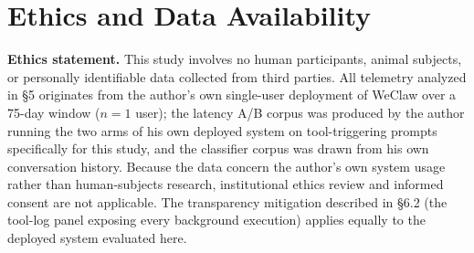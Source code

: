 \documentclass[numbered,mediumone,traditional]{oup-authoring-template}
\begin{document}
\section{Ethics and Data Availability}

\textbf{Ethics statement.} This study involves no human participants, animal subjects, or personally identifiable data collected from third parties. All telemetry analyzed in \S5 originates from the author's own single-user deployment of WeClaw over a 75-day window ($n = 1$ user); the latency A/B corpus was produced by the author running the two arms of his own deployed system on tool-triggering prompts specifically for this study, and the classifier corpus was drawn from his own conversation history. Because the data concern the author's own system usage rather than human-subjects research, institutional ethics review and informed consent are not applicable. The transparency mitigation described in \S6.2 (the tool-log panel exposing every background execution) applies equally to the deployed system evaluated here.
\end{document}
